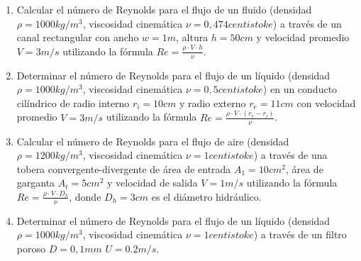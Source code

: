 \documentclass[../main]{subfiles}
\begin{document}
\begin{enumerate}
  \item Calcular el número de Reynolds para el flujo de un fluido (densidad $\rho=1000kg/m^3$, viscosidad cinemática $\nu=0,474 centistoke $) a través de un canal rectangular con ancho $w=1m$, altura $h=50cm$ y velocidad promedio $V=3m/s$ utilizando la fórmula $Re = \frac{\rho \cdot V \cdot h}{\nu}$.

  \item Determinar el número de Reynolds para el flujo de un líquido (densidad $\rho=1000kg/m^3$, viscosidad cinemática $\nu=0,5centistoke$) en un conducto cilíndrico de radio interno $r_i=10cm$ y radio externo $r_e=11cm$ con velocidad promedio $V=3m/s$ utilizando la fórmula $Re = \frac{\rho \cdot V \cdot (r_e - r_i)}{\nu}$.

  \item Calcular el número de Reynolds para el flujo de aire (densidad $\rho=1200kg/m^3$, viscosidad cinemática $\nu=1 centistoke$) a través de una tobera convergente-divergente de área de entrada $A_1=10cm^2$, área de garganta $A_t=5cm^2$ y velocidad de salida $V=1m/s$ utilizando la fórmula $Re = \frac{\rho \cdot V \cdot D_h}{\nu}$, donde $D_h=3cm$ es el diámetro hidráulico.

  \item Determinar el número de Reynolds para el flujo de un líquido (densidad $\rho=1000kg/m^3$, viscosidad cinemática $\nu=1centistoke$) a través de un filtro poroso $D=0,1mm$ $U=0.2m/s$.


\end{enumerate}
\end{document}
